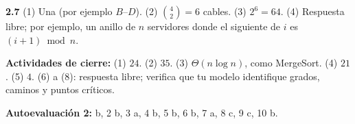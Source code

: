 \medskip\noindent\textbf{2.7}\label{resp:2-7}\quad
(1) Una (por ejemplo $B$--$D$). (2) $\binom42=6$ cables. (3) $2^6=64$. (4) Respuesta libre; por ejemplo, un anillo de $n$ servidores donde el siguiente de $i$ es $(i+1)\bmod n$.

\medskip\noindent\textbf{Actividades de cierre:} (1) $24$. (2) $35$. (3) $\Theta(n\log n)$, como MergeSort. (4) $21$. (5) $4$. (6) a (8): respuesta libre; verifica que tu modelo identifique grados, caminos y puntos cr\'iticos.

\medskip\noindent\textbf{Autoevaluaci\'on 2:}\label{resp:q2} b, 2 b, 3 a, 4 b, 5 b, 6 b, 7 a, 8 c, 9 c, 10 b.
